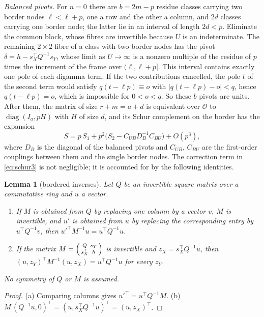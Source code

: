 \documentclass[11pt]{amsart}
\newtheorem{lemma}[theorem]{Lemma}
\theoremstyle{definition}
\theoremstyle{remark}
\numberwithin{equation}{section}
\newcommand{\cO}{\mathcal O}
\begin{document}
\emph{Balanced pivots.} For $n=0$ there are $b=2m-p$ residue classes carrying two border nodes $\ell<\ell+p$, one a row
and the other a column, and $2d$ classes carrying one border node; the latter lie in an interval of length $2d<p$. Eliminate
the common block, whose fibres are invertible because $U$ is an indeterminate. The remaining $2\times2$ fibre of a class
with two border nodes has the pivot $\delta=h-s_X^\top Q^{-1}s_Y$, whose limit as $U\to\infty$ is a nonzero multiple of the
residue of $p$ times the increment of the frame over $(\ell,\ell+p]$. This interval contains exactly one pole of each digamma
term. If the two contributions cancelled, the pole $t$ of the second term would satisfy $q(t-\ell p)\equiv o$ with
$|q(t-\ell p)-o|<q$, hence $q(t-\ell p)=o$, which is impossible for $0<o<q$. So these $b$ pivots are units. After them, the matrix
of size $r+m=a+d$ is equivalent over $\cO$ to $\operatorname{diag}(I_{a},pH)$ with $H$ of size $d$, and its Schur complement on
the border has the expansion
\begin{equation}\label{eq:schur3}
 S=p\,S_1+p^2\bigl(S_2-C_{UB}D_B^{-1}C_{BU}\bigr)+O(p^3),
\end{equation}
where $D_B$ is the diagonal of the balanced pivots and $C_{UB}$, $C_{BU}$ are the first-order couplings between them and the
single border nodes. The correction term in \eqref{eq:schur3} is not negligible; it is accounted for by the following
identities.

\begin{lemma}[bordered inverses]\label{lem:bordered}
Let $Q$ be an invertible square matrix over a commutative ring and $u$ a vector.
\begin{enumerate}[label=(\alph*),leftmargin=*]
\item If $M$ is obtained from $Q$ by replacing one column by a vector $v$, $M$ is invertible, and $u'$ is obtained from
 $u$ by replacing the corresponding entry by $u^\top Q^{-1}v$, then $u'^{\top}M^{-1}u=u^\top Q^{-1}u$.
\item If the matrix $M=\begin{psmallmatrix}Q&s_Y\\ s_X^\top&h\end{psmallmatrix}$ is invertible and
 $z_X=s_X^\top Q^{-1}u$, then $(u,z_Y)^\top M^{-1}(u,z_X)=u^\top Q^{-1}u$ for every $z_Y$.
\end{enumerate}
No symmetry of $Q$ or $M$ is assumed.
\end{lemma}
\begin{proof}
(a) Comparing columns gives $u'^{\top}=u^\top Q^{-1}M$. (b) $M\,(Q^{-1}u,0)^\top=(u,s_X^\top Q^{-1}u)^\top=(u,z_X)^\top$.
\end{proof}
\end{document}
